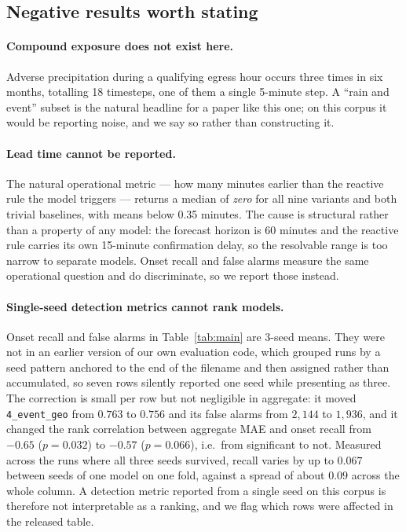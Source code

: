\documentclass[letterpaper]{article}
\begin{document}
\subsection{Negative results worth stating}

\paragraph{Compound exposure does not exist here.} Adverse precipitation during a qualifying egress hour occurs three times in six months, totalling 18 timesteps, one of them a single 5-minute step. A ``rain and event'' subset is the natural headline for a paper like this one; on this corpus it would be reporting noise, and we say so rather than constructing it.

\paragraph{Lead time cannot be reported.} The natural operational metric --- how many minutes earlier than the reactive rule the model triggers --- returns a median of \emph{zero} for all nine variants and both trivial baselines, with means below 0.35 minutes. The cause is structural rather than a property of any model: the forecast horizon is 60 minutes and the reactive rule carries its own 15-minute confirmation delay, so the resolvable range is too narrow to separate models. Onset recall and false alarms measure the same operational question and do discriminate, so we report those instead.

\paragraph{Single-seed detection metrics cannot rank models.} Onset recall and false alarms in Table~\ref{tab:main} are 3-seed means. They were not in an earlier version of our own evaluation code, which grouped runs by a seed pattern anchored to the end of the filename and then assigned rather than accumulated, so seven rows silently reported one seed while presenting as three. The correction is small per row but not negligible in aggregate: it moved \texttt{4\_event\_geo} from $0.763$ to $0.756$ and its false alarms from $2{,}144$ to $1{,}936$, and it changed the rank correlation between aggregate MAE and onset recall from $-0.65$ ($p=0.032$) to $-0.57$ ($p=0.066$), i.e.\ from significant to not. Measured across the runs where all three seeds survived, recall varies by up to $0.067$ between seeds of one model on one fold, against a spread of about $0.09$ across the whole column. A detection metric reported from a single seed on this corpus is therefore not interpretable as a ranking, and we flag which rows were affected in the released table.
\end{document}
